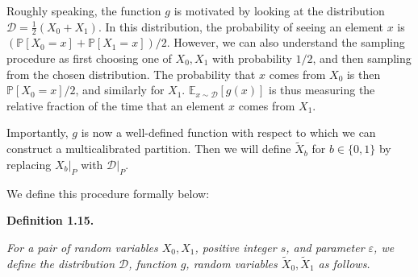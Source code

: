 \documentclass[10pt,a4paper]{article}
\begin{document}
Roughly speaking, the function $g$ is motivated by looking at the distribution $\mathcal{D}=\frac{1}{2}(X_{0}+X_{1})$. In this distribution, the probability of seeing an element $x$ is $(\mathbb{P}[X_{0}=x]+\mathbb{P}[X_{1}=x])/2$. However, we can also understand the sampling procedure as first choosing one of $X_{0},X_{1}$ with probability $1/2$, and then sampling from the chosen distribution. The probability that $x$ comes from $X_{0}$ is then $\mathbb{P}[X_{0}=x]/2$, and similarly for $X_{1}$. $\mathbb{E}_{x\sim\mathcal{D}}[g(x)]$ is thus measuring the relative fraction of the time that an element $x$ comes from $X_{1}$.\par




Importantly, $g$ is now a well-defined function with respect to which we can construct a multicalibrated partition. Then we will define $\widetilde{X}_{b}$ for $b\in\{0,1\}$ by replacing $X_{b}|_{P}$ with $\mathcal{D}|_{P}$.\par




We define this procedure formally below:\par





\par\medskip\noindent\textbf{
\textbf{Definition 1.15}\textbf{.}
}\par



\emph{For a pair of random variables $X_{0},X_{1}$, positive integer $s$, and parameter $\varepsilon$,
we define the distribution $\mathcal{D}$, function $g$, random variables $\widetilde{X}_{0},\widetilde{X}_{1}$ as follows.}\par
\end{document}
